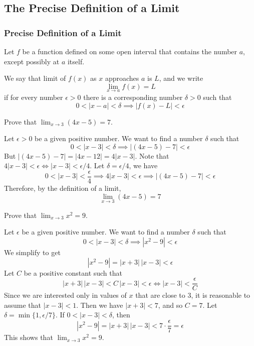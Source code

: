 \subsection{The Precise Definition of a Limit}

\subsubsection*{Precise Definition of a Limit}
Let \(f\) be a function defined on some open interval that contains the number
\(a\), except possibly at \(a\) itself.
\begin{definition}
    We say that limit of \(f(x)\) as \(x\) approaches \(a\) is \(L\),
    and we write
    \[\lim_{x\to a}f(x)=L\]
    if for every number \(\epsilon>0\) there is a corresponding number
    \(\delta>0\) such that
    \[0<|x-a|<\delta\implies|f(x)-L|<\epsilon\]
\end{definition}
\begin{problem}
    Prove that \(\displaystyle{\lim_{x\to 3}(4x-5)=7}\).
\end{problem}
\begin{solution}
    Let \(\epsilon>0\) be a given positive number.
    We want to find a number \(\delta\) such that
    \[0<|x-3|<\delta \implies|(4x-5)-7|<\epsilon\]
    But \(|(4x-5)-7|=|4x-12|=4|x-3|\).
    Note that \(4|x-3|<\epsilon\iff|x-3|<\epsilon/4\).
    Let \(\delta=\epsilon/4\), we have
    \[0<|x-3|<\frac{\epsilon}{4}\implies4|x-3|<\epsilon\implies
    |(4x-5)-7|<\epsilon\]
    Therefore, by the definition of a limit,
    \[\lim_{x\to 3}(4x-5)=7\]
\end{solution}
\begin{problem}
    Prove that \(\displaystyle{\lim_{x\to 3}x^2=9}\).
\end{problem}
\begin{solution}
    Let \(\epsilon\) be a given positive number.
    We want to find a number \(\delta\) such that
    \[0<|x-3|<\delta\implies|x^2-9|<\epsilon\]
    We simplify to get \[|x^2-9|=|x+3|\,|x-3|<\epsilon\]
    Let \(C\) be a positive constant such that
    \[|x+3|\,|x-3|<C\,|x-3|<\epsilon \iff |x-3|<\frac{\epsilon}{C}\]
    Since we are interested only in values of \(x\) that are close to 3,
    it is reasonable to assume that \(|x-3|<1\).
    Then we have \(|x+3|<7\), and so \(C=7\).
    Let \(\delta=\min\{1,\epsilon/7\}\).
    If \(0<|x-3|<\delta\),
    then
    \[|x^2-9|=|x+3|\,|x-3|<7\cdot\frac{\epsilon}{7}=\epsilon\]
    This shows that \(\displaystyle{\lim_{x\to 3}x^2=9}\).
\end{solution}
